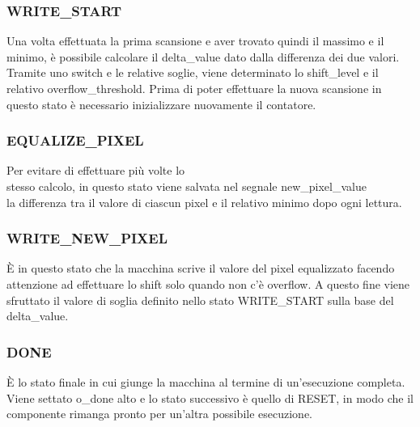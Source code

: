 \documentclass{article}
\begin{document}
\subsubsection{WRITE\_START}
Una volta effettuata la prima scansione e aver trovato quindi il massimo e il minimo, è possibile calcolare il delta\_value dato dalla differenza dei due valori. Tramite uno switch e le relative soglie, viene determinato lo shift\_level e il relativo overflow\_threshold. Prima di poter effettuare la nuova scansione in questo stato è necessario inizializzare nuovamente il contatore.

\subsubsection{EQUALIZE\_PIXEL}
Per evitare di effettuare più volte lo\\ stesso calcolo, in questo stato viene salvata nel segnale new\_pixel\_value\\ la differenza tra il valore di ciascun pixel e il relativo minimo dopo ogni lettura.

\subsubsection{WRITE\_NEW\_PIXEL}
È in questo stato che la macchina scrive il valore del pixel equalizzato facendo attenzione ad effettuare lo shift solo quando non c'è overflow. A questo fine viene sfruttato il valore di soglia definito nello stato WRITE\_START sulla base del delta\_value.

\subsubsection{DONE}
È lo stato finale in cui giunge la macchina al termine di un'esecuzione completa. Viene settato o\_done alto e lo stato successivo è quello di RESET, in modo che il componente rimanga pronto per un'altra possibile esecuzione.
\end{document}
